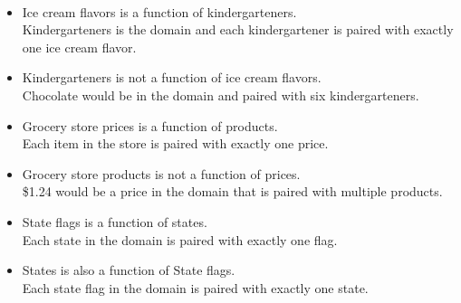 \documentclass{ximera}
\begin{document}
\begin{example}
\quad \\
\begin{itemize}
\item Ice cream flavors is a function of kindergarteners. \\
Kindergarteners is the domain and each kindergartener is paired with exactly one ice cream flavor. \\

\item Kindergarteners is not a function of ice cream flavors. \\
Chocolate would be in the domain and paired with six kindergarteners.\\

\item Grocery store prices is a function of products.\\
Each item in the store is paired with exactly one price. \\

\item Grocery store products is not a function of prices.\\
\$1.24 would be a price in the domain that is paired with multiple products.\\

\item State flags is a function of states.\\
Each state in the domain is paired with exactly one flag.\\

\item States is also a function of State flags.\\
Each state flag in the domain is paired with exactly one state.\\
\end{itemize}

\end{example}
\end{document}
